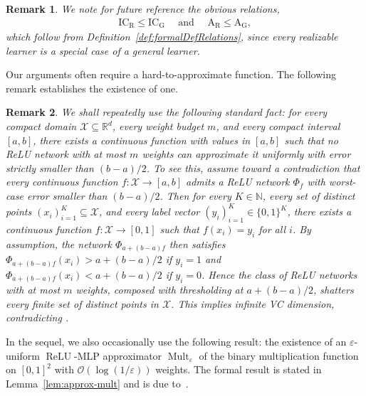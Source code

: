 \documentclass{article}
\newtheorem{remark}{Remark}[section]
\newcommand{\ICG}{\mathrm{IC_G}}
\newcommand{\ICR}{\mathrm{IC_R}}
\newcommand{\AG}{\mathrm{A_G}}
\newcommand{\AR}{\mathrm{A_R}}
\begin{document}
\begin{remark} \label{rem:trivialRelation}
We note for future reference the obvious relations, %
\begin{align*}
    \ICR \leq \ICG \quad \text{ and } \quad \AR \leq \AG,
\end{align*}
which follow from Definition~\ref{def:formalDefRelations}, since every realizable learner is a special case of a general learner.
\end{remark}

Our arguments often require a hard-to-approximate function. The following remark establishes the existence of one. 

\begin{remark}\label{rem:unattainableFunctions}
We shall repeatedly use the following standard fact: for every compact domain $\mathcal X\subseteq\mathbb R^d$, every weight budget $m$, and every compact interval $[a,b]$, there exists a continuous function with values in $[a,b]$ such that no ReLU network with at most $m$ weights can approximate it uniformly with error strictly smaller than $(b-a)/2$. To see this, assume toward a contradiction that every continuous function $f:\mathcal X\to[a,b]$ admits a ReLU network $\Phi_f$ with worst-case error smaller than $(b-a)/2$. 
Then for every $K \in \mathbb N$, every set of distinct points $(x_i)_{i=1}^K\subseteq \mathcal X$, and every label vector $(y_i)_{i=1}^K \in \{0,1\}^K$, there exists a continuous function $f:\mathcal X\to[0,1]$ such that $f(x_i)=y_i$ for all $i$. By assumption, the network $\Phi_{a+(b-a)f}$ then satisfies $\Phi_{a+(b-a)f}(x_i) > a+(b-a)/2$ if $y_i = 1$ and $\Phi_{a+(b-a)f}(x_i) < a+(b-a)/2$ if $y_i = 0$. Hence the class of ReLU networks with at most $m$ weights, composed with thresholding at $a+(b-a)/2$, shatters every finite set of distinct points in $\mathcal X$. This implies infinite VC dimension, contradicting \cite[Theorem 8.4]{AnthonyBartlett1999}. 
\end{remark}

In the sequel, we also occasionally use the following result: the existence of an $\varepsilon$-uniform $\operatorname{ReLU}$-MLP approximator $\operatorname{Mult}_{\varepsilon}$ of the binary multiplication function on $[0,1]^2$ %
with $\mathcal{O}(\log(1/\varepsilon))$ weights. The formal result is stated in Lemma~\ref{lem:approx-mult} and is due to~\cite{yarotsky2017}.
\end{document}
